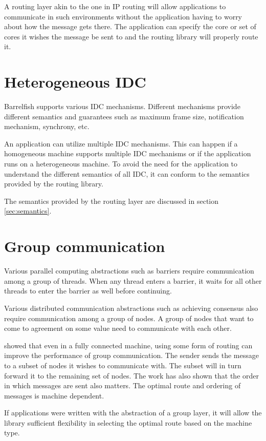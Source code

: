 \documentclass[a4paper,twoside]{report} %
\begin{document}
A routing layer akin to the one in IP routing will allow applications to communicate in
such environments without the application having to worry about
how the message gets there.
The application can specify the core or set of cores it wishes the message be sent to
and the routing library will properly route it.

\section{Heterogeneous IDC}
Barrelfish supports various IDC mechanisms.
Different mechanisms provide different semantics and guarantees such as maximum frame
size, notification mechanism, synchrony, etc.

An application can utilize multiple IDC mechanisms.
This can happen if a homogeneous machine supports multiple IDC mechanisms or if the
application runs on a heterogeneous machine.
To avoid the need for the application to understand the different semantics of all IDC,
it can conform to the semantics provided by the routing library.

The semantics provided by the routing layer are discussed in section \ref{sec:semantics}.

\section{Group communication}

Various parallel computing abstractions such as barriers
require communication among a group of threads.
When any thread enters a barrier, it waits for all other threads to enter
the barrier as well before continuing.

Various distributed communication abstractions such as achieving consensus
also require communication among a group of nodes.
A group of nodes that want to come to agreement on some value
need to communicate with each other.

\cite{nishtala:optimizing-collective:hotpar09, barrelfish:sosp09}
showed that even in a fully connected 
machine, using some form of routing can improve the performance of group communication.
The sender sends the message to a subset of nodes it wishes to communicate with.
The subset will in turn forward it to the remaining set of nodes.
The work has also shown that the order in which messages are sent also matters.
The optimal route and ordering of messages is machine dependent.

If applications were written with the abstraction of a group layer,
it will allow the library sufficient flexibility in
selecting the optimal route based on the machine type.
\end{document}
